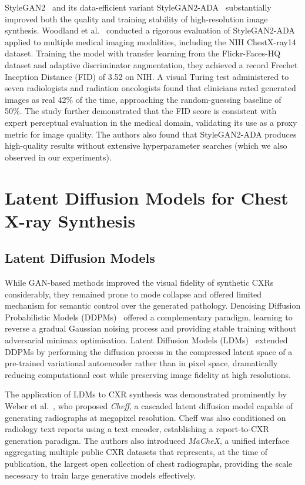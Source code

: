 StyleGAN2~\cite{Karras2020StyleGAN2} and its data-efficient variant StyleGAN2-ADA~\cite{Karras2020ADA}
substantially improved both the quality and training stability of high-resolution image
synthesis. Woodland et al.~\cite{Woodland2022} conducted a rigorous evaluation of
StyleGAN2-ADA applied to multiple medical imaging modalities, including the NIH
ChestX-ray14 dataset. Training the model with transfer learning from the Flickr-Faces-HQ
dataset and adaptive discriminator augmentation, they achieved a record Frechet Inception
Distance (FID) of 3.52 on NIH. A visual Turing test administered to seven radiologists and 
radiation oncologists found that clinicians rated generated images as real 42\% of the time, 
approaching the random-guessing baseline of 50\%.
The study further demonstrated that the FID score is consistent with expert perceptual
evaluation in the medical domain, validating its use as a proxy metric for image quality.
The authors also found that StyleGAN2-ADA produces high-quality results without extensive hyperparameter searches 
(which we also observed in our experiments).

\section{Latent Diffusion Models for Chest X-ray Synthesis}
\label{sec:rw_ldm_cxr}

\subsection{Latent  Diffusion Models}

While GAN-based methods improved the visual fidelity of synthetic CXRs considerably, they
remained prone to mode collapse and offered limited mechanism for semantic control over the
generated pathology. Denoising Diffusion Probabilistic Models (DDPMs)~\cite{Ho2020} offered a
complementary paradigm, learning to reverse a gradual Gaussian noising process and providing
stable training without adversarial minimax optimisation. Latent Diffusion Models
(LDMs)~\cite{Rombach2022} extended DDPMs by performing the diffusion process in the compressed
latent space of a pre-trained variational autoencoder rather than in pixel space, dramatically
reducing computational cost while preserving image fidelity at high resolutions.

The application of LDMs to CXR synthesis was demonstrated prominently by
Weber et al.~\cite{Weber2023Cheff}, who proposed \emph{Cheff}, a cascaded latent diffusion
model capable of generating radiographs at megapixel resolution. Cheff was also conditioned on
radiology text reports using a text encoder, establishing a report-to-CXR generation
paradigm. The authors also introduced \emph{MaCheX}, a unified interface aggregating multiple
public CXR datasets that represents, at the time of publication, the largest open collection
of chest radiographs, providing the scale necessary to train large generative models
effectively.

